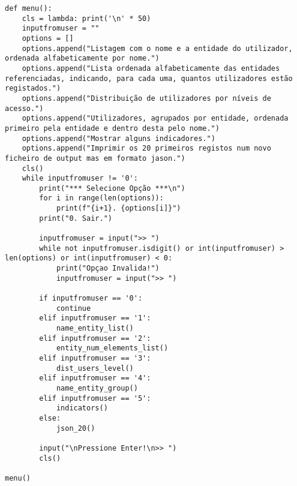 \documentclass[11pt,a4paper]{report}%
\begin{document}
\begin{verbatim}
def menu():
    cls = lambda: print('\n' * 50)
    inputfromuser = ""
    options = []
    options.append("Listagem com o nome e a entidade do utilizador, ordenada alfabeticamente por nome.")
    options.append("Lista ordenada alfabeticamente das entidades referenciadas, indicando, para cada uma, quantos utilizadores estão registados.")
    options.append("Distribuição de utilizadores por níveis de acesso.")
    options.append("Utilizadores, agrupados por entidade, ordenada primeiro pela entidade e dentro desta pelo nome.")
    options.append("Mostrar alguns indicadores.")
    options.append("Imprimir os 20 primeiros registos num novo ficheiro de output mas em formato jason.")
    cls()
    while inputfromuser != '0':
        print("*** Selecione Opção ***\n")
        for i in range(len(options)):
            print(f"{i+1}. {options[i]}")
        print("0. Sair.")

        inputfromuser = input(">> ")
        while not inputfromuser.isdigit() or int(inputfromuser) > len(options) or int(inputfromuser) < 0:
            print("Opçao Invalida!")
            inputfromuser = input(">> ")

        if inputfromuser == '0':
            continue
        elif inputfromuser == '1':
            name_entity_list()
        elif inputfromuser == '2':
            entity_num_elements_list()
        elif inputfromuser == '3':
            dist_users_level()
        elif inputfromuser == '4':
            name_entity_group()
        elif inputfromuser == '5':
            indicators()
        else:
            json_20()

        input("\nPressione Enter!\n>> ")
        cls()

menu()
\end{verbatim}







\end{document}
